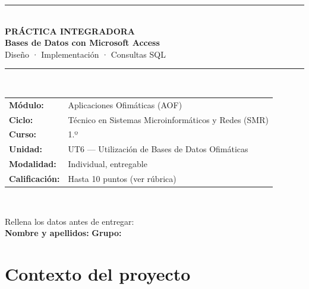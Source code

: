 \documentclass[12pt,a4paper]{article}
\begin{document}

\begin{center}
  {\color{azulSMR}\rule{\linewidth}{2.5pt}}\\[10pt]
  {\Huge\bfseries\color{azulSMR} PRÁCTICA INTEGRADORA}\\[4pt]
  {\LARGE\bfseries Bases de Datos con Microsoft Access}\\[6pt]
  {\large\color{grisOsc} Diseño · Implementación · Consultas SQL}\\[10pt]
  {\color{azulSMR}\rule{\linewidth}{1pt}}\\[8pt]
  \renewcommand{\arraystretch}{1.3}
  \begin{tabular}{@{}ll}
    \bfseries Módulo:       & Aplicaciones Ofimáticas (AOF) \\
    \bfseries Ciclo:        & Técnico en Sistemas Microinformáticos y Redes (SMR) \\
    \bfseries Curso:        & 1.º \\
    \bfseries Unidad:       & UT6 — Utilización de Bases de Datos Ofimáticas \\
    \bfseries Modalidad:    & Individual, entregable \\
    \bfseries Calificación: & Hasta 10 puntos (ver rúbrica) \\
  \end{tabular}\\[8pt]
  \colorbox{azulSMR!15}{\parbox{0.85\textwidth}{\centering\small
    Rellena los datos antes de entregar:\\[4pt]
    \textbf{Nombre y apellidos:}\enspace\underline{\hspace{7cm}}
    \quad \textbf{Grupo:}\enspace\underline{\hspace{1.5cm}}
  }}
\end{center}

\vspace{0.4cm}

\section{Contexto del proyecto}
\end{document}
